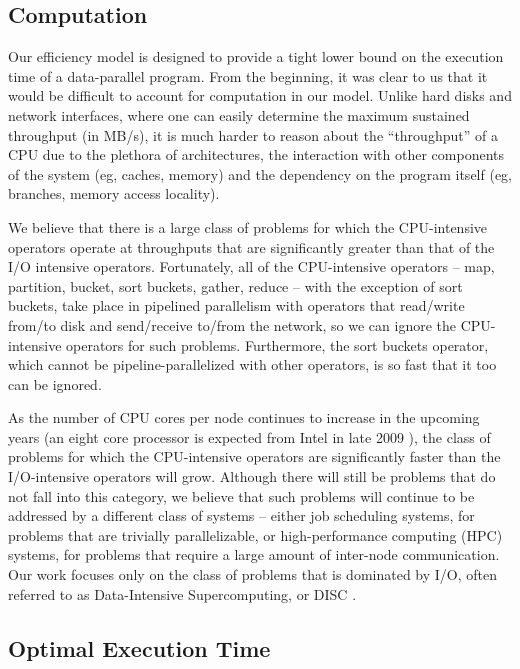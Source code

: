 \documentclass[ 11pt, letterpaper]{article}%
\begin{document}
\subsection{Computation}

Our efficiency model is designed to provide a tight lower bound on the
execution time of a data-parallel program. From the beginning, it was clear to
us that it would be difficult to account for computation in our model. Unlike
hard disks and network interfaces, where one can easily determine the
maximum sustained throughput (in MB/s), it is much harder to reason about the
``throughput'' of a CPU due to the plethora of architectures, the interaction with other components
of the system (eg, caches, memory) and the dependency on the program itself
(eg, branches, memory access locality).

We believe that there is a large class of problems for which the CPU-intensive operators operate at
throughputs that are significantly greater than that of the I/O intensive
operators. Fortunately, all of the CPU-intensive operators -- map, partition,
bucket, sort buckets, gather, reduce -- with the exception of sort buckets, take place in
pipelined parallelism with operators that read/write from/to disk and
send/receive to/from the network, so we can ignore the CPU-intensive operators
for such problems. Furthermore, the sort buckets operator,
which cannot be pipeline-parallelized with other operators, is so fast that it too can be
ignored.

As the number of CPU cores per node continues to increase in the upcoming
years (an eight core processor is expected from Intel in late 2009
\cite{intel}), the class of problems for which the CPU-intensive operators are significantly faster than the I/O-intensive operators will grow. Although
there will still be problems that do not fall into this category, we believe that
such problems will continue to be addressed by a different class of systems --
either job scheduling systems, for problems that are trivially parallelizable, or high-performance computing (HPC)
systems, for problems that require a large amount of inter-node communication.
Our work focuses only on the class of problems that is dominated by I/O, often
referred to as Data-Intensive Supercomputing, or DISC \cite{disc}.

\subsection{Optimal Execution Time}\label{sec:optimalexecutiontime}
\end{document}
